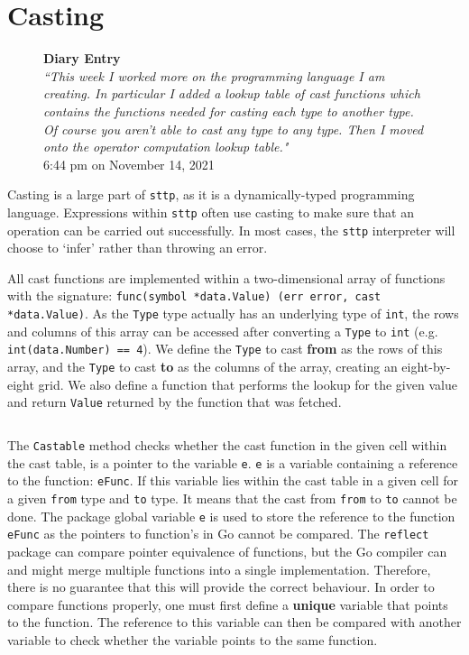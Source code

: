 \section{Casting}
\label{sec:development-casting}

\begin{figure}[H]
    \begin{center}
        \textbf{Diary Entry}\\[0.5em]
        \textit{``This week I worked more on the programming language I am creating. In particular I added a lookup table of cast functions which contains the functions needed for casting each type to another type. Of course you aren’t able to cast any type to any type. Then I moved onto the operator computation lookup table."}\\[0.5em]
        \tiny{6:44 pm on November 14, 2021}
    \end{center}
\end{figure}

Casting is a large part of \verb|sttp|, as it is a dynamically-typed programming language. Expressions within \verb|sttp| often use casting to make sure that an operation can be carried out successfully. In most cases, the \verb|sttp| interpreter will choose to `infer' rather than throwing an error.

All cast functions are implemented within a two-dimensional array of functions with the signature: \texttt{func(symbol *data.Value) (err error, cast *data.Value)}. As the \verb|Type| type actually has an underlying type of \texttt{int}, the rows and columns of this array can be accessed after converting a \verb|Type| to \texttt{int} (e.g. \texttt{int(data.Number) == 4}). We define the \verb|Type| to cast \textbf{from} as the rows of this array, and the \verb|Type| to cast \textbf{to} as the columns of the array, creating an eight-by-eight grid. We also define a function that performs the lookup for the given value and return \verb|Value| returned by the function that was fetched.

\inputminted[firstline=26, lastline=43, autogobble, breaklines, tabsize=4]{go}{../../src/eval/casting.go}

The \verb|Castable| method checks whether the cast function in the given cell within the cast table, is a pointer to the variable \verb|e|. \verb|e| is a variable containing a reference to the function: \verb|eFunc|. If this variable lies within the cast table in a given cell for a given \verb|from| type and \verb|to| type. It means that the cast from \verb|from| to \verb|to| cannot be done. The package global variable \verb|e| is used to store the reference to the function \verb|eFunc| as the pointers to function's in Go cannot be compared. The \verb|reflect| package can compare pointer equivalence of functions, but the Go compiler can and might merge multiple functions into a single implementation. Therefore, there is no guarantee that this will provide the correct behaviour. In order to compare functions properly, one must first define a \textbf{unique} variable that points to the function. The reference to this variable can then be compared with another variable to check whether the variable points to the same function.


